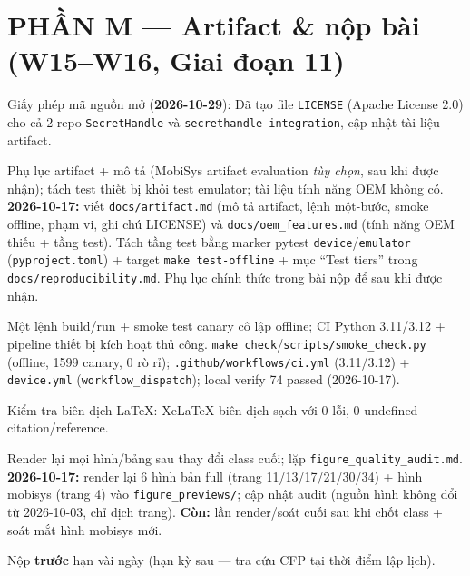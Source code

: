 \documentclass[11pt,a4paper]{article}
\newcommand{\done}{\textcolor{shgreen}{$\blacksquare$}}
\newcommand{\doing}{\textcolor{shblue}{$\boxdot$}}
\newcommand{\todo}{\textcolor{shgray}{$\square$}}
\newcommand{\code}[1]{\texttt{\small #1}}
\begin{document}
\section*{PHẦN M --- Artifact \& nộp bài (W15--W16, Giai đoạn 11)}
\begin{chk}
\item[\done] Giấy phép mã nguồn mở (\textbf{2026-10-29}): Đã tạo file \code{LICENSE} (Apache License 2.0) cho cả 2 repo \code{SecretHandle} và \code{secrethandle-integration}, cập nhật tài liệu artifact.
\item[\done] Phụ lục artifact + mô tả (MobiSys artifact evaluation \emph{tùy chọn}, sau khi được nhận); tách test thiết bị khỏi test emulator; tài liệu tính năng OEM không có. \textbf{2026-10-17:} viết \code{docs/artifact.md} (mô tả artifact, lệnh một-bước, smoke offline, phạm vi, ghi chú LICENSE) và \code{docs/oem\_features.md} (tính năng OEM thiếu + tầng test). Tách tầng test bằng marker pytest \code{device}/\code{emulator} (\code{pyproject.toml}) + target \code{make test-offline} + mục ``Test tiers'' trong \code{docs/reproducibility.md}. Phụ lục chính thức trong bài nộp để sau khi được nhận.
\item[\done] Một lệnh build/run + smoke test canary cô lập offline; CI Python 3.11/3.12 + pipeline thiết bị kích hoạt thủ công. \code{make check}/\code{scripts/smoke\_check.py} (offline, 1599 canary, 0 rò rỉ); \code{.github/workflows/ci.yml} (3.11/3.12) + \code{device.yml} (\code{workflow\_dispatch}); local verify 74 passed (2026-10-17).
\item[\done] Kiểm tra biên dịch LaTeX: XeLaTeX biên dịch sạch với 0 lỗi, 0 undefined citation/reference.
\item[\doing] Render lại mọi hình/bảng sau thay đổi class cuối; lặp \code{figure\_quality\_audit.md}. \textbf{2026-10-17:} render lại 6 hình bản full (trang 11/13/17/21/30/34) + hình mobisys (trang 4) vào \code{figure\_previews/}; cập nhật audit (nguồn hình không đổi từ 2026-10-03, chỉ dịch trang). \textbf{Còn:} lần render/soát cuối sau khi chốt class + soát mắt hình mobisys mới.
\item[\todo] Nộp \textbf{trước} hạn vài ngày (hạn kỳ sau --- tra cứu CFP tại thời điểm lập lịch).
\end{chk}
\end{document}
